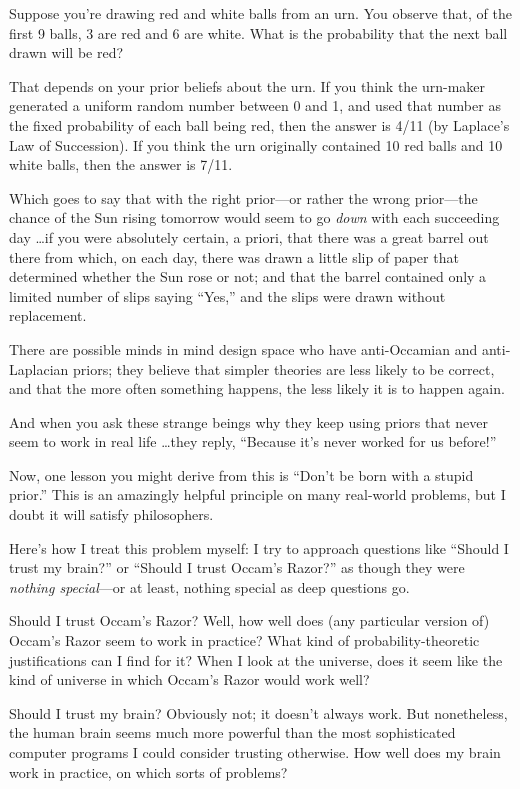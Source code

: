 {
 Suppose you're drawing red and white balls from an
urn. You observe that, of the first 9 balls, 3 are red and 6 are white.
What is the probability that the next ball drawn will be red?}

{
 That depends on your prior beliefs about the urn. If you think the
urn-maker generated a uniform random number between 0 and 1, and used
that number as the fixed probability of each ball being red, then the
answer is 4/11 (by Laplace's Law of Succession). If you
think the urn originally contained 10 red balls and 10 white balls,
then the answer is 7/11.}

{
 Which goes to say that with the right prior---or rather the wrong
prior---the chance of the Sun rising tomorrow would seem to go
\textit{down} with each succeeding day \ldots if you were absolutely
certain, a priori, that there was a great barrel out there from which,
on each day, there was drawn a little slip of paper that determined
whether the Sun rose or not; and that the barrel contained only a
limited number of slips saying
``Yes,'' and the slips were drawn
without replacement.}

{
 There are possible minds in mind design space who have
anti-Occamian and anti-Laplacian priors; they believe that simpler
theories are less likely to be correct, and that the more often
something happens, the less likely it is to happen again.}

{
 And when you ask these strange beings why they keep using priors
that never seem to work in real life \ldots they reply,
``Because it's never worked for us
before!''}

{
 Now, one lesson you might derive from this is
``Don't be born with a stupid
prior.'' This is an amazingly helpful principle on
many real-world problems, but I doubt it will satisfy philosophers.}

{
 Here's how I treat this problem myself: I try to
approach questions like ``Should I trust my
brain?'' or ``Should I trust
Occam's Razor?'' as though they were
\textit{nothing special}{}---or at least, nothing special as deep
questions go.}

{
 Should I trust Occam's Razor? Well, how well does
(any particular version of) Occam's Razor seem to work
in practice? What kind of probability-theoretic justifications can I
find for it? When I look at the universe, does it seem like the kind of
universe in which Occam's Razor would work well?}

{
 Should I trust my brain? Obviously not; it doesn't
always work. But nonetheless, the human brain seems much more powerful
than the most sophisticated computer programs I could consider trusting
otherwise. How well does my brain work in practice, on which sorts of
problems?}

